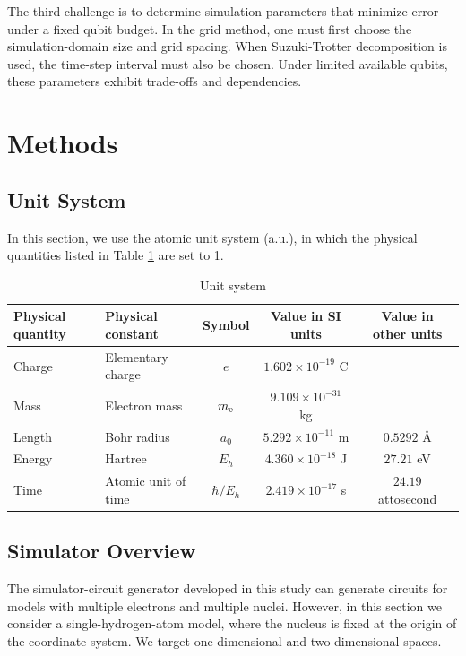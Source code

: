 \documentclass[a4paper,11pt]{article}
\begin{document}
The third challenge is to determine simulation parameters that minimize error
under a fixed qubit budget. In the grid method, one must first choose the
simulation-domain size and grid spacing. When Suzuki-Trotter decomposition is
used, the time-step interval must also be chosen. Under limited available
qubits, these parameters exhibit trade-offs and dependencies.

\section{Methods}
\subsection{Unit System}

In this section, we use the atomic unit system (a.u.), in which the physical
quantities listed in Table \ref{tab:unit-system} are set to 1.

\begin{table}[ht]
    \centering
    \begin{tabular}{llccc}
        Physical quantity & Physical constant & Symbol & Value in SI units & Value in other units \\
        \hline
        Charge & Elementary charge & $e$ & $1.602\times10^{-19}$ C \\
        Mass & Electron mass & $m_{\mathrm{e}}$ & $9.109\times10^{-31}$ kg \\
        Length & Bohr radius & $a_0$ & $5.292\times10^{-11}$ m & $0.5292$ \AA \\
        Energy & Hartree & $E_h$ & $4.360\times10^{-18}$ J & $27.21$ eV \\
        Time & Atomic unit of time & $\hbar/E_h$ & $2.419\times10^{-17}$ s & $24.19$ attosecond \\
    \end{tabular}
    \caption{Unit system}
    \label{tab:unit-system}
\end{table}


\subsection{Simulator Overview}

The simulator-circuit generator developed in this study can generate circuits
for models with multiple electrons and multiple nuclei. However, in this
section we consider a single-hydrogen-atom model, where the nucleus is fixed at
the origin of the coordinate system. We target one-dimensional and
two-dimensional spaces.
\end{document}
